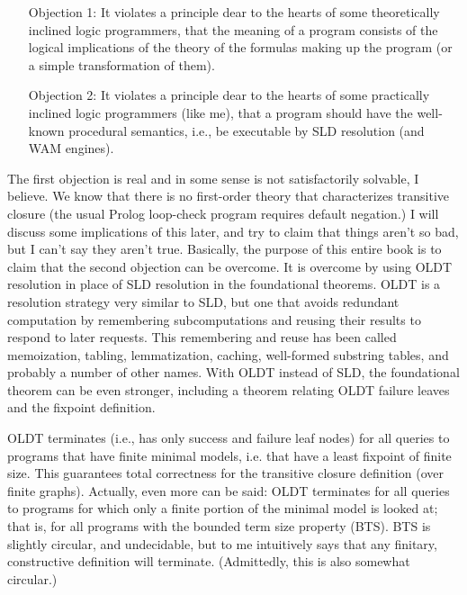 \begin{itemize}
\item[Objection 1:] 
It violates a principle dear to the hearts of some theoretically
inclined logic programmers, that the meaning of a program consists of
the logical implications of the theory of the formulas making up the
program (or a simple transformation of them).

\item[Objection 2:]
It violates a principle dear to the hearts of some practically
inclined logic programmers (like me), that a program should have the
well-known procedural semantics, i.e., be executable by SLD resolution
(and WAM engines).

\end{itemize} 

The first objection is real and in some sense is not satisfactorily
solvable, I believe.  We know that there is no first-order theory that
characterizes transitive closure (the usual Prolog loop-check program
requires default negation.)  I will discuss some implications of this
later, and try to claim that things aren't so bad, but I can't say
they aren't true.  Basically, the purpose of this entire book is to
claim that the second objection can be overcome.  It is overcome by
using OLDT resolution in place of SLD resolution in the foundational
theorems.  OLDT is a resolution strategy very similar to SLD, but one
that avoids redundant computation by remembering subcomputations and
reusing their results to respond to later requests.  This remembering
and reuse has been called memoization, tabling, lemmatization,
caching, well-formed substring tables, and probably a number of other
names.  With OLDT instead of SLD, the foundational theorem can be even
stronger, including a theorem relating OLDT failure leaves and the
fixpoint definition.

OLDT terminates (i.e., has only success and failure leaf nodes) for
all queries to programs that have finite minimal models, i.e. that
have a least fixpoint of finite size.  This guarantees total
correctness for the transitive closure definition (over finite
graphs).  Actually, even more can be said: OLDT terminates for all
queries to programs for which only a finite portion of the minimal
model is looked at; that is, for all programs with the bounded term
size property (BTS).  BTS is slightly circular, and undecidable, but
to me intuitively says that any finitary, constructive definition will
terminate.  (Admittedly, this is also somewhat circular.)

